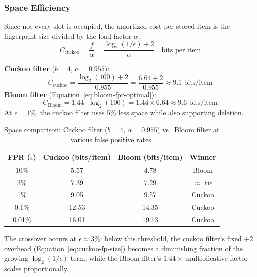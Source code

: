 \subsubsection{Space Efficiency}

Since not every slot is occupied, the amortized cost per stored item 
is the fingerprint size divided by the load factor $\alpha$:
\begin{equation}
  C_{\text{cuckoo}} = \frac{f}{\alpha} 
  = \frac{\log_2(1/\epsilon) + 2}{\alpha} 
  \quad \text{bits per item}
  \label{eq:cuckoo-space}
\end{equation}

\begin{examplebox}[Space Comparison at $\epsilon = 1\%$]
\textbf{Cuckoo filter} ($b = 4$, $\alpha = 0.955$):
\[
  C_{\text{cuckoo}} = \frac{\log_2(100) + 2}{0.955} 
  = \frac{6.64 + 2}{0.955} \approx 9.1 \text{ bits/item}
\]
\textbf{Bloom filter} (Equation~\ref{eq:bloom-fpr-optimal}):
\[
  C_{\text{Bloom}} = 1.44 \cdot \log_2(100) 
  = 1.44 \times 6.64 \approx 9.6 \text{ bits/item}
\]
At $\epsilon = 1\%$, the cuckoo filter uses 5\% less space while also 
supporting deletion.
\end{examplebox}

\begin{table}[H]
  \centering
  \caption{Space comparison: Cuckoo filter ($b = 4$, $\alpha = 0.955$) 
           vs.\ Bloom filter at various false positive rates.}
  \label{tab:cuckoo-vs-bloom}
  \begin{tabular}{c c c c}
    \hline
    \textbf{FPR} ($\epsilon$) & 
    \textbf{Cuckoo} (bits/item) & 
    \textbf{Bloom} (bits/item) & 
    \textbf{Winner} \\
    \hline
    10\%     & 5.57  & 4.78  & Bloom \\
    3\%      & 7.39  & 7.29  & $\approx$ tie \\
    1\%      & 9.05  & 9.57  & Cuckoo \\
    0.1\%    & 12.53 & 14.35 & Cuckoo \\
    0.01\%   & 16.01 & 19.13 & Cuckoo \\
    \hline
  \end{tabular}
\end{table}

The crossover occurs at $\epsilon \approx 3\%$: below this threshold, 
the cuckoo filter's fixed $+2$ overhead 
(Equation~\ref{eq:cuckoo-fp-size}) becomes a diminishing fraction of the 
growing $\log_2(1/\epsilon)$ term, while the Bloom filter's $1.44\times$ 
multiplicative factor scales proportionally.

